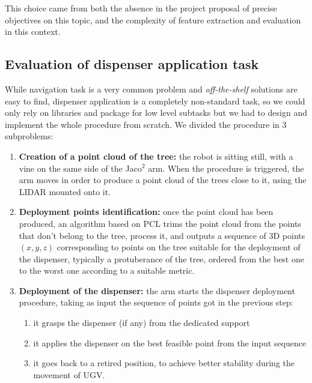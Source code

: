 This choice came from both the absence in the project proposal of precise objectives on this topic, and the complexity of feature extraction and evaluation in this context.

\subsection{Evaluation of dispenser application task}
 While navigation task is a very common problem and \textit{off-the-shelf} solutions are easy to find, dispenser application is a completely non-standard task, so we could only rely on libraries and package for low level subtasks but we had to design and implement the whole procedure from scratch. We divided the procedure in 3 subproblems:
 \begin{enumerate}
 	\item \textbf{Creation of a point cloud of the tree:} the robot is sitting still, with a vine on the same side of the Jaco$^2$ arm. When the procedure is triggered, the arm moves in order to produce a point cloud of the trees close to it, using the \ac{LIDAR} mounted onto it. 
 	\item \textbf{Deployment points identification:} once the point cloud has been produced, an algorithm based on \ac{PCL} trims the point cloud from the points that don't belong to the tree, process it, and outputs a sequence of 3D points $(x,y,z)$ corresponding to points on the tree suitable for the deployment of the dispenser, typically a protuberance of the tree, ordered from the best one to the worst one according to a suitable metric.
 	\item \textbf{Deployment of the dispenser:} the arm starts the dispenser deployment procedure, taking as input the sequence of points got in the previous step:
 	\begin{enumerate}
 		\item it grasps the dispenser (if any) from the dedicated support
 		\item it applies the dispenser on the best feasible point from the input sequence
 		\item it goes back to a retired position, to achieve better stability during the movement of \ac{UGV}.
 	\end{enumerate}

\end{enumerate}
